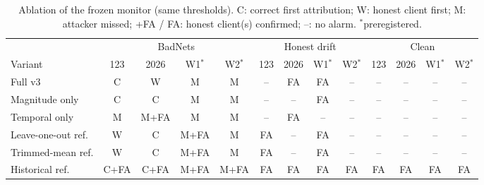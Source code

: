 \begin{table}[t]
\centering\footnotesize
\setlength{\tabcolsep}{2.6pt}
\caption{Ablation of the frozen monitor (same thresholds). C: correct first attribution; W: honest client first; M: attacker missed; +FA / FA: honest client(s) confirmed; --: no alarm. $^\ast$preregistered.}
\label{tab:ablation}
\begin{tabular}{@{}l cccc cccc cccc@{}}
\toprule
 & \multicolumn{4}{c}{BadNets} & \multicolumn{4}{c}{Honest drift} & \multicolumn{4}{c}{Clean} \\
\cmidrule(lr){2-5}\cmidrule(lr){6-9}\cmidrule(lr){10-13}
Variant & 123 & 2026 & W1$^\ast$ & W2$^\ast$ & 123 & 2026 & W1$^\ast$ & W2$^\ast$ & 123 & 2026 & W1$^\ast$ & W2$^\ast$ \\
\midrule
Full v3 & C & W & M & M & -- & FA & FA & -- & -- & -- & -- & -- \\
Magnitude only & C & C & M & M & -- & -- & FA & -- & -- & -- & -- & -- \\
Temporal only & M & M+FA & M & M & -- & FA & -- & -- & -- & -- & -- & -- \\
Leave-one-out ref. & W & C & M+FA & M & FA & -- & FA & -- & -- & -- & -- & -- \\
Trimmed-mean ref. & W & C & M+FA & M & FA & -- & FA & -- & -- & -- & -- & -- \\
Historical ref. & C+FA & C+FA & M+FA & M+FA & FA & FA & FA & FA & FA & FA & FA & FA \\
\bottomrule
\end{tabular}
\end{table}
